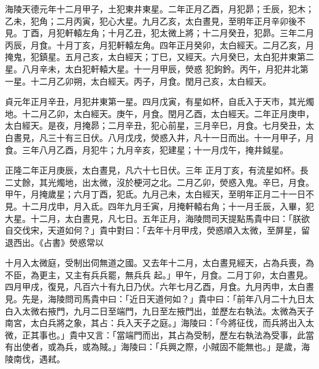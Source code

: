 \begin{pinyinscope}
 海陵天德元年十二月甲子，土犯東井東星。二年正月乙酉，月犯昴；壬辰，犯木；乙未，犯角；二月丙寅，犯心大星。九月乙亥，太白晝見，至明年正月辛卯後不見。丁酉，月犯軒轅左角；十月乙丑，犯太微上將；十二月癸丑，犯昴。三年二月丙辰，月食。十月丁亥，月犯軒轅左角。四年正月癸卯，太白經天。二月乙亥，月掩鬼，犯鎮星。五月己亥，太白經天；丁巳，又經天。六月癸巳，太白犯井東第二星。八月辛未，太白犯軒轅大星。十一月甲辰，熒惑
 犯鉤鈐。丙午，月犯井北第一星。十二月乙卯朔，太白經天。丙子，月食。閏月己亥，太白經天。



 貞元年正月辛丑，月犯井東第一星。四月戊寅，有星如杯，自氐入于天市，其光燭地。十二月乙卯，太白經天。庚午，月食。閏月乙酉，太白經天。二年正月庚申，太白經天。是夜，月掩昴；二月辛丑，犯心前星，三月辛巳，月食。七月癸丑，太白晝見，凡三十有三日伏。八月戊戌，熒惑入井，凡十一日而出。十一月甲子，月食。三年八月乙酉，月犯牛；九月辛亥，犯建星；十一月戊午，掩井鉞星。



 正隆二年正月庚辰，太白晝見，凡六十七日伏。三年
 正月丁亥，有流星如杯。長二丈餘，其光燭地，出太微，沒於梗河之北。二月乙卯，熒惑入鬼。辛巳，月食。甲午，月掩歲星；六月丁酉，犯氐。九月己未，太白經天，至明年正月二十一日不見。十二月戊申，月入氐。四年九月壬寅，月掩軒轅右角；十一月壬辰，入畢，犯大星。十二月，太白晝見，凡七日。五年正月，海陵問司天提點馬貴中曰：「朕欲自交伐宋，天道如何？」貴中對曰：「去年十月甲戌，熒惑順入太微，至屏星，留退西出。《占書》熒惑常以



 十月入太微庭，受制出伺無道之國。又去年十二月，太白晝見經天，占為兵喪，為不臣，為更主，又主有兵兵罷，無兵兵
 起。」甲午，月食。二月丁卯，太白晝見。四月甲戌，復見，凡百六十有九日乃伏。六年七月乙酉，月食。九月丙申，太白晝見。先是，海陵問司馬貴中曰：「近日天道何如？」貴中曰：「前年八月二十九日太白入太微右掖門，九月二日至端門，九日至左掖門出，並歷左右執法。太微為天子南宮，太白兵將之象，其占：兵入天子之庭。」海陵曰：「今將征伐，而兵將出入太微，正其事也。」貴中又言：「當端門而出，其占為受制，歷左右執法為受事，此當有出使者，或為兵，或為賊。」海陵曰：「兵興之際，小賊固不能無也。」是歲，海陵南伐，遇弒。




\end{pinyinscope}
